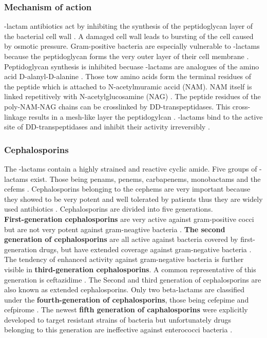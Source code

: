 \subsubsection{Mechanism of action}
\textbeta-lactam antibiotics act by inhibiting the synthesis of the peptidoglycan layer of the bacterial cell wall \cite{noauthor_-lactam_2019}. A damaged cell wall leads to bursting of the cell caused by osmotic pressure. Gram-positive bacteria are especially vulnerable to \textbeta-lactams because the peptidoglycan forms the very outer layer of their cell membrane \cite{graevemoore_english:_2008}.\\
Peptidoglycan synthesis is inhibited becuase \textbeta-lactams are analogues of the amino acid D-alanyl-D-alanine \cite{fisher_bacterial_2005}. Those tow amino acids form the terminal residues of the peptide which is attached to N-acetylmuramic accid (NAM). NAM itself is linked repetitively with N-acetylglucosamine (NAG) \cite{fisher_bacterial_2005}. The peptide residues of the poly-NAM-NAG chains can be crosslinked by DD-transpeptidases. This cross-linkage results in a mesh-like layer the peptidogylcan \cite{fisher_bacterial_2005}. \textbeta-lactams bind to the active site of DD-transpeptidases and inhibit their activity irreversibly \cite{fisher_bacterial_2005}.

\subsubsection{Cephalosporins}
The \textbeta-lactams contain a highly strained and reactive cyclic amide. Five groups of \textbeta-lactams exist. Those being penams, penems, carbapenems, monobactams and the cefems \cite{beta-lactam_nodate}. 
Cephalosporins belonging to the cephems are very important because they showed to be very potent and well tolerated by patients thus they are widely used antibiotics \cite{dancer_problem_2001}. Cephalosporins are divided into five generations.\\
\textbf{First-generation cephalosporins} are very active against gram-positive cocci but are not very potent against gram-neagtive bacteria \cite{fernandes_-lactams:_2013}. \textbf{The second generation of cephalosporins} are all active against bacteria covered by first-generation drugs, but have extended coverage against gram-negative bacteria \cite{fernandes_-lactams:_2013}. The tendency of enhanced activity against gram-negative bacteria is further visible in \textbf{third-generation cephalosporins}. A common representative of this generation is ceftazidime \cite{klein_third-generation_1995}. The Second and third generation of cephalosporins are also known as extended cephalosporins. Only two beta-lactams are classified under the \textbf{fourth-generation of cephalosporins}, those being cefepime and cefpirome \cite{fernandes_-lactams:_2013}. The newest \textbf{fifth generation of caphalosporins} were explicitly developed to target resistant strains of bacteria but unfortunately drugs belonging to this generation are ineffective against enterococci bacteria \cite{fernandes_-lactams:_2013}.\\

